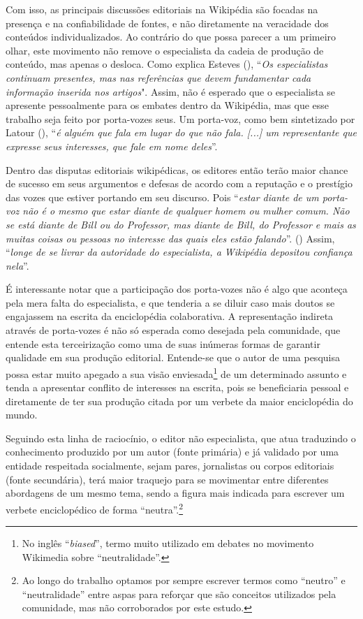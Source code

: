 Com isso, as principais discussões editoriais na Wikipédia são focadas na presença e na confiabilidade de fontes, e não diretamente na veracidade dos conteúdos individualizados. Ao contrário do que possa parecer a um primeiro olhar, este movimento não remove o especialista da cadeia de produção de conteúdo, mas apenas o desloca. Como explica Esteves (\citeyear[p.62]{esteves_as_2014}), ``\textit{Os especialistas continuam presentes, mas nas referências que devem fundamentar cada informação inserida nos artigos}". Assim, não é esperado que o especialista se apresente pessoalmente para os embates dentro da Wikipédia, mas que esse trabalho seja feito por porta-vozes seus. Um porta-voz, como bem sintetizado por Latour (\citeyear[p.108]{latour_ciencia_1987}),  ``\textit{é alguém que fala em lugar do que não fala. [...] um representante que expresse seus interesses, que fale em nome deles}''.

Dentro das disputas editoriais wikipédicas, os editores então terão maior chance de sucesso em seus argumentos e defesas de acordo com a reputação e o prestígio das vozes que estiver portando em seu discurso. Pois ``\textit{estar diante de um porta-voz não é o mesmo que estar diante de qualquer homem ou mulher comum. Não se está diante de Bill ou do Professor, mas diante de Bill, do Professor e mais as muitas coisas ou pessoas no interesse das quais eles estão falando}''. (\citep[p. 109]{latour_ciencia_1987}) Assim, ``\textit{longe de se livrar da autoridade do especialista, a Wikipédia depositou confiança nela}''\citep[p. 121]{jankowski_wikipedia_2013}.

É interessante notar que a participação dos porta-vozes não é algo que aconteça pela mera falta do especialista, e que tenderia a se diluir caso mais doutos se engajassem na escrita da enciclopédia colaborativa. A representação indireta através de porta-vozes é não só esperada como desejada pela comunidade, que entende esta terceirização como uma de suas inúmeras formas de garantir qualidade em sua produção editorial. Entende-se que o autor de uma pesquisa possa estar muito apegado a sua visão enviesada\footnote{No inglês ``\textit{biased}'', termo muito utilizado em debates no movimento Wikimedia sobre ``neutralidade''.} de um determinado assunto e tenda a apresentar conflito de interesses na escrita, pois se beneficiaria pessoal e diretamente de ter sua produção citada por um verbete da maior enciclopédia do mundo. 

Seguindo esta linha de raciocínio, o editor não especialista, que atua traduzindo o conhecimento produzido por um autor (fonte primária) e já validado por uma entidade respeitada socialmente, sejam pares, jornalistas ou corpos editoriais (fonte secundária), terá maior traquejo para se movimentar entre diferentes abordagens de um mesmo tema, sendo a figura mais indicada para escrever um verbete enciclopédico de forma ``neutra''.\footnote{Ao longo do trabalho optamos por sempre escrever termos como ``neutro'' e ``neutralidade'' entre aspas para reforçar que são conceitos utilizados pela comunidade, mas não corroborados por este estudo.}

